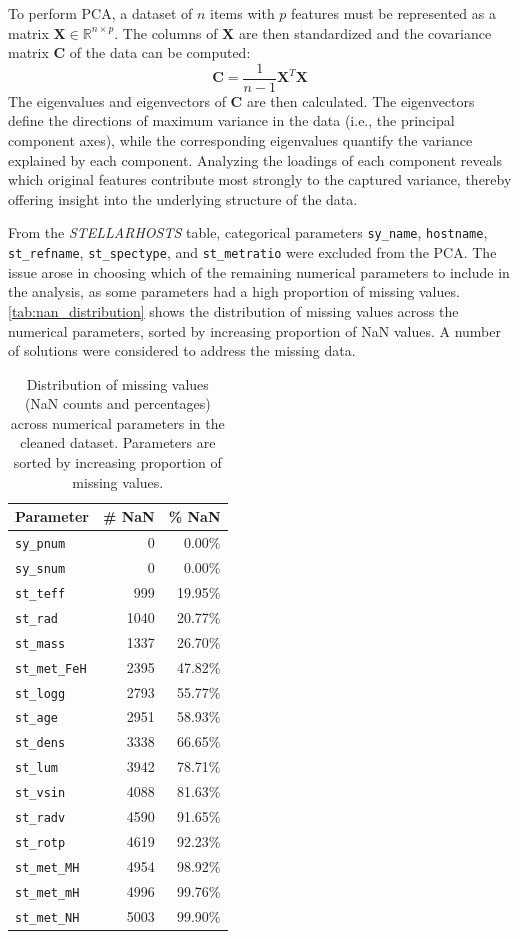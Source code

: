 \documentclass[preprint,longauthor,twocolumn]{aastex631}
\begin{document}
To perform PCA, a dataset of $n$ items with $p$ features must be represented as a matrix $\mathbf{X} \in \mathbb{R}^{n \times p}$. The columns of $\mathbf{X}$ are then standardized and the covariance matrix $\mathbf{C}$ of the data can be computed:
\begin{equation}
  \mathbf{C} = \frac{1}{n-1} \mathbf{X}^T \mathbf{X}
\end{equation}
The eigenvalues and eigenvectors of $\mathbf{C}$ are then calculated. The eigenvectors define the directions of maximum variance in the data (i.e., the principal component axes), while the corresponding eigenvalues quantify the variance explained by each component. Analyzing the loadings of each component reveals which original features contribute most strongly to the captured variance, thereby offering insight into the underlying structure of the data.

From the \textit{STELLARHOSTS} table, categorical parameters \verb|sy_name|, \verb|hostname|, \verb|st_refname|, \verb|st_spectype|, and \verb|st_metratio| were excluded from the PCA. The issue arose in choosing which of the remaining numerical parameters to include in the analysis, as some parameters had a high proportion of missing values. \autoref{tab:nan_distribution} shows the distribution of missing values across the numerical parameters, sorted by increasing proportion of NaN values. A number of solutions were considered to address the missing data.
\begin{table}
  \centering
  \begin{tabular}{lrr}
    \hline
    \textbf{Parameter} & \textbf{\# NaN} & \textbf{\% NaN} \\
    \hline
    \verb|sy_pnum| & 0 & 0.00\% \\
    \verb|sy_snum| & 0 & 0.00\% \\
    \verb|st_teff| & 999 & 19.95\% \\
    \verb|st_rad| & 1040 & 20.77\% \\
    \verb|st_mass| & 1337 & 26.70\% \\
    \verb|st_met_FeH| & 2395 & 47.82\% \\
    \verb|st_logg| & 2793 & 55.77\% \\
    \verb|st_age| & 2951 & 58.93\% \\
    \verb|st_dens| & 3338 & 66.65\% \\
    \verb|st_lum| & 3942 & 78.71\% \\
    \verb|st_vsin| & 4088 & 81.63\% \\
    \verb|st_radv| & 4590 & 91.65\% \\
    \verb|st_rotp| & 4619 & 92.23\% \\
    \verb|st_met_MH| & 4954 & 98.92\% \\
    \verb|st_met_mH| & 4996 & 99.76\% \\
    \verb|st_met_NH| & 5003 & 99.90\% \\
    \hline
  \end{tabular}
  \caption{Distribution of missing values (NaN counts and percentages) across numerical parameters in the cleaned dataset. Parameters are sorted by increasing proportion of missing values.}
  \label{tab:nan_distribution}
\end{table}
\end{document}
